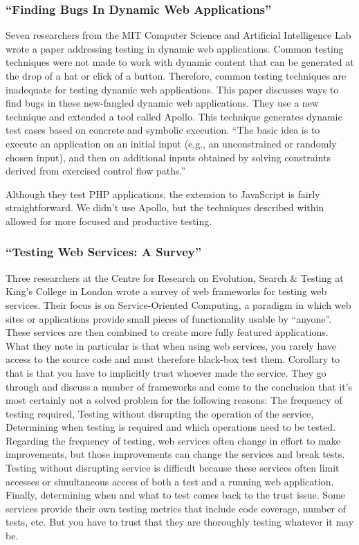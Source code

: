\documentclass[11pt]{article}
\begin{document}
\subsubsection{``Finding Bugs In Dynamic Web Applications'' \cite{FindingBugs}}
Seven researchers from the MIT Computer Science and Artificial Intelligence Lab wrote a paper addressing testing in dynamic web applications. Common testing techniques were not made to work with dynamic content that can be generated at the drop of a hat or click of a button. Therefore, common testing techniques are inadequate for testing dynamic web applications. This paper discusses ways to find bugs in these new-fangled dynamic web applications. They use a new technique and extended a tool called Apollo. This technique generates dynamic test cases based on concrete and symbolic execution. ``The basic idea is to execute an application on an initial input (e.g., an unconstrained or randomly chosen input), and then on additional inputs obtained by solving constraints derived from exercised control flow paths.''

Although they test PHP applications, the extension to JavaScript is fairly straightforward. We didn't use Apollo, but the techniques described within allowed for more focused and productive testing.

\subsubsection{``Testing Web Services: A Survey'' \cite{TestingWebServicesSurvey}}
Three researchers at the Centre for Research on Evolution, Search \& Testing at King's College in London wrote a survey of web frameworks for testing web services. Their focus is on Service-Oriented Computing, a paradigm in which web sites or applications provide small pieces of functionality usable by ``anyone''. These services are then combined to create more fully featured applications. What they note in particular is that when using web services, you rarely have access to the source code and must therefore black-box test them. Corollary to that is that you have to implicitly trust whoever made the service. They go through and discuss a number of frameworks and come to the conclusion that it's most certainly not a solved problem for the following reasons: The frequency of testing required, Testing without disrupting the operation of the service, Determining when testing is required and which operations need to be tested. Regarding the frequency of testing, web services often change in effort to make improvements, but those improvements can change the services and break tests. Testing without disrupting service is difficult because these services often limit accesses or simultaneous access of both a test and a running web application. Finally, determining when and what to test comes back to the trust issue. Some services provide their own testing metrics that include code coverage, number of tests, etc. But you have to trust that they are thoroughly testing whatever it may be.
\end{document}
